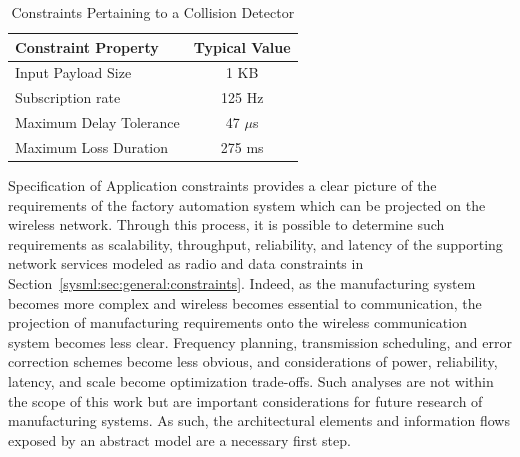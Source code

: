 
\begin{table}[tbp]
	\centering
	\caption{Constraints Pertaining to a Collision Detector} \label{tab:sample:constraints}
	\begin{tabular}{lc}
		
		\textbf{Constraint Property} &
		\textbf{Typical Value}
		\\
		\midrule
		Input Payload Size &
		1 KB
		\\
		Subscription rate &
		125 Hz
		\\
		Maximum Delay Tolerance &
		47 $\mu$s
		\\
		Maximum Loss Duration &
		275 ms
		\\
	\end{tabular}%
	
\end{table}

Specification of Application constraints provides a clear picture of the requirements of the factory automation system which can be projected on the wireless network. Through this process, it is possible to determine such requirements as scalability, throughput, reliability, and latency of the supporting network services modeled as radio and data constraints in Section~\ref{sysml:sec:general:constraints}. Indeed, as the manufacturing system becomes more complex and wireless becomes essential to communication, the projection of manufacturing requirements onto the wireless communication system becomes less clear.  Frequency planning, transmission scheduling, and error correction schemes become less obvious, and considerations of power, reliability, latency, and scale become optimization trade-offs. Such analyses are not within the scope of this work but are important considerations for future research of manufacturing systems.  As such, the architectural elements and information flows exposed by an abstract model are a necessary first step.

